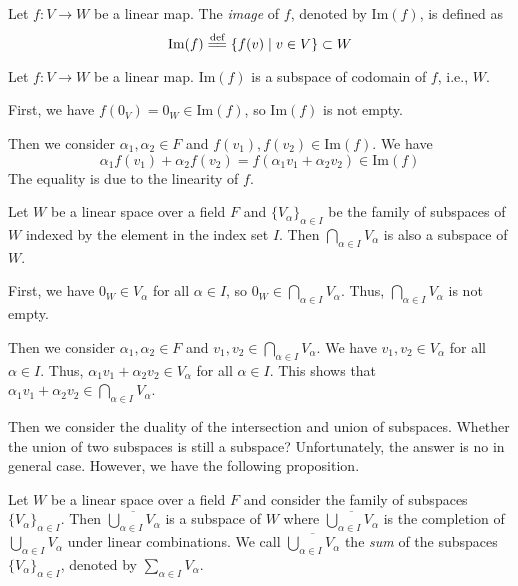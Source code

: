 \documentclass[
	11pt, %
	fleqn, %
	a4paper, %
]{LegrandOrangeBook}
\renewcommand{\Im}[1]{\text{Im}(#1)} %
\renewcommand{\bar}[1]{\overline{#1}} %
\begin{document}
\begin{definition}[Images]
    Let $f : V \to W$ be a linear map. The \emph{image} of $f$, denoted by $\Im f$, is defined as 
    \[
        \Im f \overset{\text{def}}{=\joinrel=} \{ f(v) \mid v \in V \} \subset W
    \]
\end{definition}

\begin{example}
    Let $f : V \to W$ be a linear map. $\Im f$ is a subspace of codomain of $f$, i.e., $W$.

    First, we have $f(0_V) = 0_W \in \Im f$, so $\Im f$ is not empty.

    Then we consider $\alpha_1, \alpha_2 \in F$ and $f(v_1), f(v_2) \in \Im f$. We have 
    \[
        \alpha_1 f(v_1) + \alpha_2 f(v_2) = f(\alpha_1 v_1 + \alpha_2 v_2) \in \Im f
    \]
    The equality is due to the linearity of $f$.
\end{example}

\begin{example}
    Let $W$ be a linear space over a field $F$ and $\{V_\alpha\}_{\alpha \in I}$ be the family of subspaces of $W$ indexed by the element in the index set $I$. Then $\bigcap_{\alpha \in I} V_\alpha$ is also a subspace of $W$.

    First, we have $0_W \in V_\alpha$ for all $\alpha \in I$, so $0_W \in \bigcap_{\alpha \in I} V_\alpha$. Thus, $\bigcap_{\alpha \in I} V_\alpha$ is not empty.

    Then we consider $\alpha_1, \alpha_2 \in F$ and $v_1, v_2 \in \bigcap_{\alpha \in I} V_\alpha$. We have $v_1, v_2 \in V_\alpha$ for all $\alpha \in I$. Thus, $\alpha_1 v_1 + \alpha_2 v_2 \in V_\alpha$ for all $\alpha \in I$. This shows that $\alpha_1 v_1 + \alpha_2 v_2 \in \bigcap_{\alpha \in I} V_\alpha$.
\end{example}

Then we consider the duality of the intersection and union of subspaces. Whether the union of two subspaces is still a subspace? Unfortunately, the answer is no in general case. However, we have the following proposition.

\begin{proposition}
    Let $W$ be a linear space over a field $F$ and consider the family of subspaces $\{V_\alpha\}_{\alpha \in I}$. Then $\bar{\bigcup_{\alpha \in I} V_\alpha}$ is a subspace of $W$ where $\bar{\bigcup_{\alpha \in I} V_\alpha}$ is the completion of $\bigcup_{\alpha \in I} V_\alpha$ under linear combinations. We call $\bar{\bigcup_{\alpha \in I} V_\alpha}$ the \emph{sum} of the subspaces $\{V_\alpha\}_{\alpha \in I}$, denoted by $\sum_{\alpha \in I} V_\alpha$.
\end{proposition}
\end{document}
